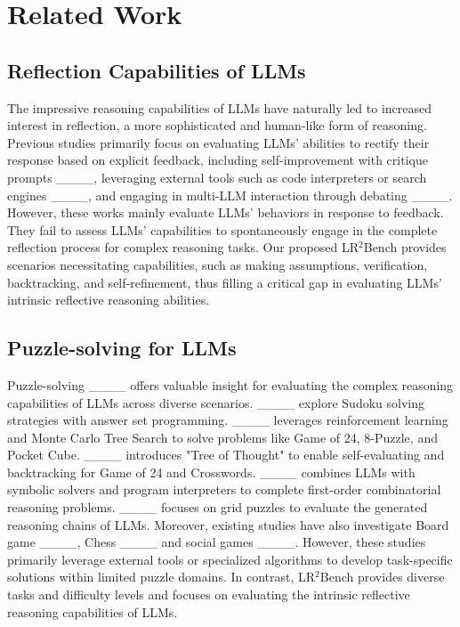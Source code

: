 \section{Related Work}
\subsection{Reflection Capabilities of LLMs}
The impressive reasoning capabilities of LLMs have naturally led to increased interest in reflection, a more sophisticated and human-like form of reasoning. Previous studies primarily focus on evaluating LLMs' abilities to rectify their response based on explicit feedback, including self-improvement with critique prompts ____, leveraging external tools such as code interpreters or search engines ____, and engaging in multi-LLM interaction through debating ____. However, these works mainly evaluate LLMs' behaviors in response to feedback. They fail to assess LLMs' capabilities to spontaneously engage in the complete reflection process for complex reasoning tasks. Our proposed LR$^2$Bench provides scenarios necessitating capabilities, such as making assumptions, verification, backtracking, and self-refinement, thus filling a critical gap in evaluating LLMs' intrinsic reflective reasoning abilities.

\subsection{Puzzle-solving for LLMs}
Puzzle-solving ____ offers valuable insight for evaluating the complex reasoning capabilities of LLMs across diverse scenarios. ____ explore Sudoku solving strategies with answer set programming. ____ leverages reinforcement learning and Monte Carlo Tree Search to solve problems like Game of 24, 8-Puzzle, and Pocket Cube. ____ introduces "Tree of Thought" to enable self-evaluating and backtracking for Game of 24 and Crosswords. ____ combines LLMs with symbolic solvers and program interpreters to complete first-order combinatorial reasoning problems. ____ focuses on grid puzzles to evaluate the generated reasoning chains of LLMs. Moreover, existing studies have also investigate Board game ____, Chess ____ and social games ____. However, these studies primarily leverage external tools or specialized algorithms to develop task-specific solutions within limited puzzle domains. In contrast, LR$^2$Bench provides diverse tasks and difficulty levels and focuses on evaluating the intrinsic reflective reasoning capabilities of LLMs.